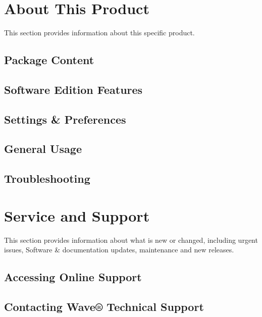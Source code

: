 \documentclass[letterpaper,10pt,english]{sphinxmanual}
\begin{document}
\chapter{About This Product}
\label{\detokenize{thisproduct:about-this-product}}\label{\detokenize{thisproduct::doc}}
This section provides information about this specific product.


\section{Package Content}
\label{\detokenize{thisproduct:package-content}}

\section{Software Edition Features}
\label{\detokenize{thisproduct:software-edition-features}}

\section{Settings \& Preferences}
\label{\detokenize{thisproduct:settings-preferences}}

\section{General Usage}
\label{\detokenize{thisproduct:general-usage}}

\section{Troubleshooting}
\label{\detokenize{thisproduct:troubleshooting}}

\chapter{Service and Support}
\label{\detokenize{serviceandsupport:service-and-support}}\label{\detokenize{serviceandsupport::doc}}
This section provides information about what is new or changed, including urgent issues, Software \& documentation updates, maintenance and new releases.


\section{Accessing Online Support}
\label{\detokenize{serviceandsupport:accessing-online-support}}

\section{Contacting Wave® Technical Support}
\label{\detokenize{serviceandsupport:contacting-wave-technical-support}}
\end{document}
